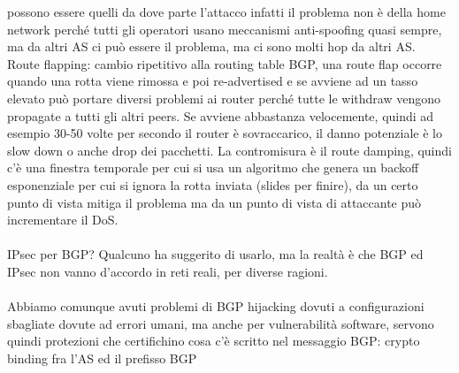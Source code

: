\documentclass[12pt, oneside]{extbook} %
\begin{document}
possono essere quelli da dove parte l'attacco infatti il problema non è della home network perché tutti gli operatori usano meccanismi anti-spoofing quasi sempre, ma da altri AS ci può essere il problema, ma ci sono molti hop da altri AS.\\Route flapping: cambio ripetitivo alla routing table BGP, una route flap occorre quando una rotta viene rimossa e poi re-advertised e se avviene ad un tasso elevato può portare diversi problemi ai router perché tutte le withdraw vengono propagate a tutti gli altri peers. Se avviene abbastanza velocemente, quindi ad esempio 30-50 volte per secondo il router è sovraccarico, il danno potenziale è lo slow down o anche drop dei pacchetti. La contromisura è il route damping, quindi c'è una finestra temporale per cui si usa un algoritmo che genera un backoff esponenziale per cui si ignora la rotta inviata (slides per finire), da un certo punto di vista mitiga il problema ma da un punto di vista di attaccante può incrementare il DoS.\\\\IPsec per BGP? Qualcuno ha suggerito di usarlo, ma la realtà è che BGP ed IPsec non vanno d'accordo in reti reali, per diverse ragioni.\\\\Abbiamo comunque avuti problemi di BGP hijacking dovuti a configurazioni sbagliate dovute ad errori umani, ma anche per vulnerabilità software, servono quindi protezioni che certifichino cosa c'è scritto nel messaggio BGP: crypto binding fra l'AS ed il prefisso BGP
\end{document}
